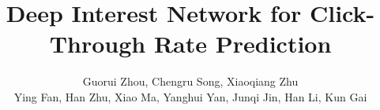 \documentclass[sigconf]{acmart}
\begin{document}
\title{Deep Interest Network for Click-Through Rate Prediction}

\author{Guorui Zhou, Chengru Song, Xiaoqiang Zhu \\
  Ying Fan, Han Zhu, Xiao Ma, Yanghui Yan, Junqi Jin, Han Li, Kun Gai}

\begin{abstract}


\end{abstract}
\end{document}
